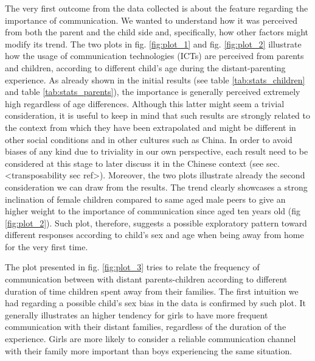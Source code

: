 The very first outcome from the data collected is about the feature regarding the importance of communication. We wanted to understand how it was perceived from both the parent and the child side and, specifically, how other factors might modify its trend. The two plots in fig. \ref{fig:plot_1} and fig. \ref{fig:plot_2} illustrate how the usage of communication technologies (ICTs) are perceived from parents and children, according to different child's age during the distant-parenting experience. As already shown in the initial results (see table \ref{tab:stats_children} and table \ref{tab:stats_parents}), the importance is generally perceived extremely high regardless of age differences. Although this latter might seem a trivial consideration, it is useful to keep in mind that such results are strongly related to the context from which they have been extrapolated and might be different in other social conditions and in other cultures such as China. In order to avoid biases of any kind due to triviality in our own perspective, each result need to be considered at this stage to later discuss it in the Chinese context (see sec. <transposability sec ref>).
Moreover, the two plots illustrate already the second consideration we can draw from the results. The trend clearly showcases a strong inclination of female children compared to same aged male peers to give an higher weight to the importance of communication since aged ten years old (fig \ref{fig:plot_2}). Such plot, therefore, suggests a possible exploratory pattern toward different responses according to child's sex and age when being away from home for the very first time. 

The plot presented in fig. \ref{fig:plot_3} tries to relate the frequency of communication between with distant parents-children according to different duration of time children  spent away from their families. The first intuition we had regarding a possible child's sex bias in the data is confirmed by such plot. It generally illustrates an higher tendency for girls to have more frequent communication with their distant families, regardless of the duration of the experience. Girls are more likely to consider a reliable communication channel with their family more important than boys experiencing the same situation.


